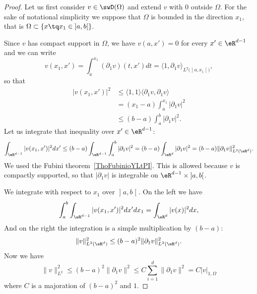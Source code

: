 \begin{proof}
Let us first consider \( v\in\swD(\Omega)\) and extend \( v\) with \( 0\) outside \( \Omega\). For the sake of notational simplicity we suppose that \( \Omega\) is bounded in the direction \( x_1\), that is \( \Omega\subset \{ x\tq x_1\in \mathopen] a , b \mathclose[ \}\).

Since \( v\) has compact support in \( \Omega\), we have \( v(a,x')=0\) for every \( x'\in \eR^{d-1}\) and we can write
    \begin{equation}
    v(x_1,x')=   \int_a^{x_1}(\partial_1v)(t,x')dt=\langle 1, \partial_1v\rangle_{L^2\big( \mathopen] a , x_1 \mathclose[ \big)},
    \end{equation}
    so that
    \begin{subequations}
        \begin{align}
            | v(x_1,x') |^2&\leq \langle 1, 1\rangle \langle \partial_1v, \partial_1v\rangle \\
            &=(x_1-a)\int_a^{x_1}| \partial_1 v|^2\\
            &\leq(b-a)\int_a^b| \partial_1v |^2.
        \end{align}
    \end{subequations}
    Let us integrate that inequality over \( x'\in \eR^{d-1}\):
    \begin{equation}
        \int_{\eR^{d-1}}| v(x_1,x') |^2dx'\leq (b-a)\int_{\eR^{d-1}}\int_a^b| \partial_1v |^2=(b-a)\int_{\eR^d}| \partial_1v |^2=(b-a)\| \partial_1v \|^2_{L^2(\eR^d)}.
    \end{equation}
    We used the Fubini theorem~\ref{ThoFubinioYLtPI}. This is allowed because \( v\) is compactly supported, so that \( | \partial_1v |\) is integrable on \( \eR^{d-1}\times \mathopen] a , b \mathclose[\).

    We integrate with respect to \( x_1\) over \( \mathopen] a , b \mathclose[\). On the left we have
        \begin{equation}
            \int_a^b\int_{\eR^{d-1}}| v(x_1,x') |^2dx'dx_1=\int_{\eR^d}| v(x) |^2dx,
        \end{equation}
        And on the right the integration is a simple multiplication by \( (b-a)\):
        \begin{equation}
            \| v \|^2_{L^2(\eR^d)}\leq (b-a)^2\| \partial_1v \|^2_{L^2(\eR^d)}.
        \end{equation}
        Now we have
        \begin{equation}
            \| v \|^2_{L^2}\leq (b-a)^2\| \partial_1v \|^2\leq C\sum_{i=1}^d\| \partial_1v \|^2=C| v |_{1,\Omega}
        \end{equation}
        where \( C\) is a majoration of \( (b-a)^2\) and \( 1\).


\end{proof}
